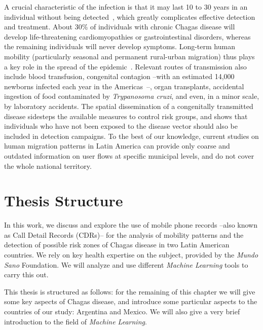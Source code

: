 A crucial characteristic of the infection is that it may last 10 to 30 years in an individual without being detected~\cite{rassi2012american}, which greatly complicates effective detection and treatment. About 30\% of individuals with chronic Chagas disease will develop life-threatening cardiomyopathies or gastrointestinal disorders, whereas
the remaining individuals will never develop symptoms.
Long-term human mobility (particularly seasonal and permanent rural-urban migration) thus plays a key role in the spread of the epidemic~\cite{briceno2009chagas}. Relevant routes of transmission also include blood transfusion, congenital contagion --with an estimated 14,000 newborns infected each year in the Americas~\cite{OPS2006chagas}--,
organ transplants,
accidental ingestion of food contaminated by \textit{Trypanosoma cruzi}, and even, in a minor scale,
by laboratory accidents.
The spatial dissemination of a congenitally transmitted disease sidesteps the available measures to control risk groups, and shows that individuals who have not been exposed to the disease vector should also be included in detection campaigns.
To the best of our knowledge, current studies on human migration patterns in Latin America can provide only coarse and outdated information on user flows at specific municipal levels, and do not cover the whole national territory.

\section{Thesis Structure}

In this work, we discuss and explore the use of mobile phone records --also known as Call Detail Records (CDRs)-- for the analysis of mobility patterns and the detection of possible risk zones of Chagas disease in two Latin American countries. 
We rely on key health expertise on the subject, provided by the \textit{Mundo Sano} Foundation. 
We will analyze and use different \textit{Machine Learning} tools to carry this out.

This thesis is structured as follows: for the remaining of this chapter we will give some key aspects of Chagas disease, and introduce some particular aspects to the countries of our study: Argentina and Mexico. We will also give a very brief introduction to the field of \textit{Machine Learning}.

